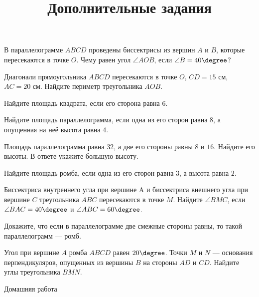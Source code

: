 \begin{class}[number=2]
\begin{listofex}
		\item В параллелограмме \( ABCD \) проведены биссектрисы из вершин \( A \) и \( B \), которые пересекаются в точке \( O \). Чему равен угол \( \angle AOB \), если \( \angle B= 40\degree \)?
		\item Диагонали прямоугольника \( ABCD \) пересекаются в точке \( O \), \( CD=15 \) см, \( AC=20 \) см. Найдите периметр треугольника \( AOB \).
		\item Найдите площадь квадрата, если его сторона равна \( 6 \).
		\item Найдите площадь параллелограмма, если одна из его сторон равна \( 8 \), а опущенная на неё высота равна \( 4 \).
		\item  Площадь параллелограмма равна \( 32 \), а две его стороны равны \( 8 \) и \( 16 \). Найдите его высоты. В ответе укажите большую высоту.
		\item Найдите площадь ромба, если одна из его сторон равна \( 3 \), а высота равна \( 2 \).
	\end{listofex}
	\title{Дополнительные задания}
	\begin{listofex}
		\item Биссектриса внутреннего угла при вершине A и биссектриса внешнего угла при вершине \( C \) треугольника \( ABC \)
		пересекаются в точке \( M \). Найдите \( \angle BMC \), если \( \angle BAC = 40\degree \) и \( \angle ABC = 60\degree \).
		\item Докажите, что если в параллелограмме две смежные стороны равны, то такой параллелограмм --- ромб.
		\item Угол при вершине \( A \) ромба \( ABCD \) равен \( 20\degree \). Точки \( M \) и \( N \) --- основания перпендикуляров, опущенных из вершины \( B \) на стороны \( AD \) и \( CD \). Найдите углы треугольника \( BMN \).
	\end{listofex}
\end{class}

\begin{homework}[number=2]
	\begin{listofex}
		\item Домашняя работа
	\end{listofex}
\end{homework}

